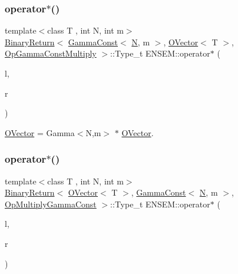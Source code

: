 \subsubsection{\texorpdfstring{operator$\ast$()}{operator*()}\hspace{0.1cm}{\footnotesize\ttfamily [5/8]}}
{\footnotesize\ttfamily template$<$class T , int N, int m$>$ \\
\mbox{\hyperlink{structENSEM_1_1BinaryReturn}{Binary\+Return}}$<$ \mbox{\hyperlink{classENSEM_1_1GammaConst}{Gamma\+Const}}$<$ \mbox{\hyperlink{operator__name__util_8cc_a7722c8ecbb62d99aee7ce68b1752f337}{N}}, m $>$, \mbox{\hyperlink{classENSEM_1_1OVector}{O\+Vector}}$<$ T $>$, \mbox{\hyperlink{structENSEM_1_1OpGammaConstMultiply}{Op\+Gamma\+Const\+Multiply}} $>$\+::Type\+\_\+t E\+N\+S\+E\+M\+::operator$\ast$ (\begin{DoxyParamCaption}\item[{const \mbox{\hyperlink{classENSEM_1_1GammaConst}{Gamma\+Const}}$<$ \mbox{\hyperlink{operator__name__util_8cc_a7722c8ecbb62d99aee7ce68b1752f337}{N}}, m $>$ \&}]{l,  }\item[{const \mbox{\hyperlink{classENSEM_1_1OVector}{O\+Vector}}$<$ T $>$ \&}]{r }\end{DoxyParamCaption})\hspace{0.3cm}{\ttfamily [inline]}}



\mbox{\hyperlink{classENSEM_1_1OVector}{O\+Vector}} = Gamma$<$\+N,m$>$ $\ast$ \mbox{\hyperlink{classENSEM_1_1OVector}{O\+Vector}}. 

\mbox{\label{group__obsvector_ga4cead70d208b90a7a2b58aa6251d78b0}} 
\subsubsection{\texorpdfstring{operator$\ast$()}{operator*()}\hspace{0.1cm}{\footnotesize\ttfamily [6/8]}}
{\footnotesize\ttfamily template$<$class T , int N, int m$>$ \\
\mbox{\hyperlink{structENSEM_1_1BinaryReturn}{Binary\+Return}}$<$ \mbox{\hyperlink{classENSEM_1_1OVector}{O\+Vector}}$<$ T $>$, \mbox{\hyperlink{classENSEM_1_1GammaConst}{Gamma\+Const}}$<$ \mbox{\hyperlink{operator__name__util_8cc_a7722c8ecbb62d99aee7ce68b1752f337}{N}}, m $>$, \mbox{\hyperlink{structENSEM_1_1OpMultiplyGammaConst}{Op\+Multiply\+Gamma\+Const}} $>$\+::Type\+\_\+t E\+N\+S\+E\+M\+::operator$\ast$ (\begin{DoxyParamCaption}\item[{const \mbox{\hyperlink{classENSEM_1_1OVector}{O\+Vector}}$<$ T $>$ \&}]{l,  }\item[{const \mbox{\hyperlink{classENSEM_1_1GammaConst}{Gamma\+Const}}$<$ \mbox{\hyperlink{operator__name__util_8cc_a7722c8ecbb62d99aee7ce68b1752f337}{N}}, m $>$ \&}]{r }\end{DoxyParamCaption})\hspace{0.3cm}{\ttfamily [inline]}}



